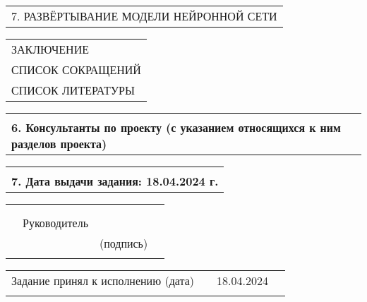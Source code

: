 \documentclass[12pt, А4, twoside]{article} %
\begin{document}
\begin{FlushLeft}
    \begin{tabular}{p{17.25cm}} 
        \textsf{7. РАЗВЁРТЫВАНИЕ МОДЕЛИ НЕЙРОННОЙ СЕТИ} \vspace{1pt} \hline \\
    \end{tabular}  

    \begin{tabular}{p{17.25cm}} 
        \textsf{ЗАКЛЮЧЕНИЕ} \vspace{2pt} \hline \\
        \textsf{СПИСОК СОКРАЩЕНИЙ} \vspace{1pt} \hline \\
        \textsf{СПИСОК ЛИТЕРАТУРЫ} \vspace{2pt} \hline 
    \end{tabular} 

    \begin{tabular}{p{17.25cm}} 
        \vspace{1pt} \hline  \\
        \textsf{\textbf{6. Консультанты по проекту (с указанием относящихся к ним разделов проекта)}} \vspace{1pt} \hline \\
    \end{tabular}   

    \begin{tabular}{p{17.25cm}} 
        \vspace{1pt} \hline  \\
        \textsf{\textbf{7. Дата выдачи задания: 18.04.2024 г.}} \vspace{1pt} \hline \\
    \end{tabular} 

    \begin{tabular}{p{4.2cm} p{3.8cm} p{6.0cm} p{2.0cm}} 
        & & & 
        \\ 
        & & & 
        \\
        & \fontsize{14}{17.5} \textrm{Руководитель} & 
        \vspace{1pt} \hline & 
        \\ 
        & & \centering \fontsize{12}{15} \textsf{(подпись)} & 
        \\ 
        & & &
    \end{tabular} 

\fontsize{12}{15}

    \begin{tabular}{p{7.5cm} p{0.5cm} p{6.0cm} p{2.0cm}} %
        \textsf{Задание принял к исполнению (дата)} & &
        \centering \textsf{18.04.2024} \vspace{1pt} \hline & 
        \\ %
        & & & %
    \end{tabular} %


\end{FlushLeft}
\end{document}
